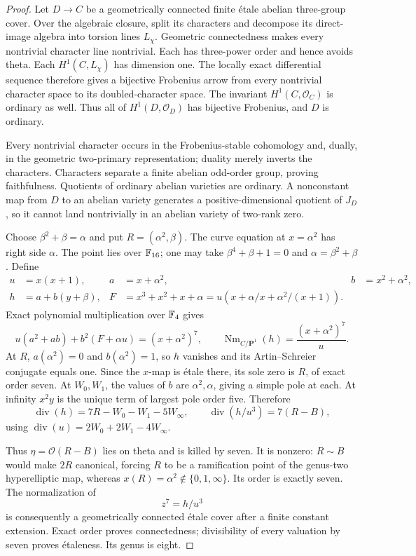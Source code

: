 \begin{proof}
Let $D\to C$ be a geometrically connected finite \'etale abelian
three-group cover. Over the algebraic closure, split its characters
and decompose its direct-image algebra into torsion lines $L_\chi$.
Geometric connectedness makes every nontrivial character line
nontrivial. Each has three-power order and hence avoids theta.
Each $H^1(C,L_\chi)$ has dimension one. The locally exact
differential sequence therefore gives a bijective Frobenius arrow
from every nontrivial character space to its doubled-character
space. The invariant $H^1(C,\mathcal O_C)$ is ordinary as well.
Thus all of $H^1(D,\mathcal O_D)$ has bijective Frobenius, and
$D$ is ordinary.

Every nontrivial character occurs in the Frobenius-stable
cohomology and, dually, in the geometric two-primary
representation; duality merely inverts the characters.
Characters separate a finite abelian odd-order group, proving
faithfulness. Quotients of ordinary abelian varieties are
ordinary. A nonconstant map from $D$ to an abelian variety
generates a positive-dimensional quotient of $J_D$, so it
cannot land nontrivially in an abelian variety of two-rank zero.

Choose $\beta^2+\beta=\alpha$ and put $R=(\alpha^2,\beta)$.
The curve equation at $x=\alpha^2$ has right side $\alpha$.
The point lies over $\mathbb F_{16}$; one may take
$\beta^4+\beta+1=0$ and $\alpha=\beta^2+\beta$.
Define
\[
 \begin{aligned}
 u&=x(x+1),& a&=x+\alpha^2,& b&=x^2+\alpha^2,\\
 h&=a+b(y+\beta),&
 F&=x^3+x^2+x+\alpha
     =u\left(x+\alpha/x+\alpha^2/(x+1)\right).
 \end{aligned}
\]
Exact polynomial multiplication over $\mathbb F_4$ gives
\[
          u(a^2+ab)+b^2(F+\alpha u)=(x+\alpha^2)^7,
 \qquad
          \operatorname{Nm}_{C/\mathbf P^1}(h)
                    =\frac{(x+\alpha^2)^7}{u}.                  \tag{C2.33}
\]
At $R$, $a(\alpha^2)=0$ and $b(\alpha^2)=1$, so $h$ vanishes
and its Artin--Schreier conjugate equals one. Since the $x$-map
is \'etale there, its sole zero is $R$, of exact order seven.
At $W_0,W_1$, the values of $b$ are $\alpha^2,\alpha$,
giving a simple pole at each. At infinity $x^2y$ is the unique
term of largest pole order five. Therefore
\[
 \operatorname{div}(h)=7R-W_0-W_1-5W_\infty,\qquad
 \operatorname{div}(h/u^3)=7(R-B),                               \tag{C2.34}
\]
using $\operatorname{div}(u)=2W_0+2W_1-4W_\infty$.

Thus $\eta=\mathcal O(R-B)$ lies on theta and is killed by seven.
It is nonzero: $R\sim B$ would make $2R$ canonical, forcing
$R$ to be a ramification point of the genus-two hyperelliptic
map, whereas $x(R)=\alpha^2\notin\{0,1,\infty\}$.
Its order is exactly seven. The normalization of
\[
                              z^7=h/u^3
\]
is consequently a geometrically connected \'etale cover
after a finite constant extension. Exact order proves
connectedness; divisibility of every valuation by seven proves
\'etaleness. Its genus is eight.


\end{proof}
